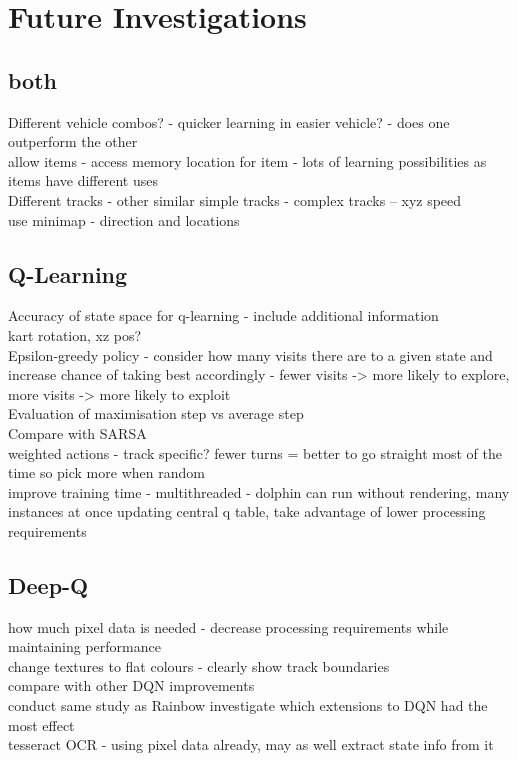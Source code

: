 
\chapter{Future Investigations}
\section{both}
Different vehicle combos? - quicker learning in easier vehicle? - does one outperform the other
\\ allow items - access memory location for item - lots of learning possibilities as items have different uses
\\Different tracks - other similar simple tracks - complex tracks -- xyz speed
\\ use minimap - direction and locations

\section{Q-Learning}
Accuracy of state space for q-learning - include additional information\\
kart rotation, xz pos?
\\ Epsilon-greedy policy - consider how many visits there are to a given state and increase chance of taking best accordingly - fewer visits -> more likely to explore, more visits -> more likely to exploit
\\ Evaluation of maximisation step vs average step
\\ Compare with SARSA
\\ weighted actions - track specific? fewer turns = better to go straight most of the time so pick more when random
\\ improve training time - multithreaded - dolphin can run without rendering, many instances at once updating central q table, take advantage of lower processing requirements

\section{Deep-Q}
how much pixel data is needed - decrease processing requirements while maintaining performance
\\ change textures to flat colours - clearly show track boundaries
\\ compare with other DQN improvements
\\ conduct same study as Rainbow \cite{hessel2018rainbow} investigate which extensions to DQN had the most effect
\\ tesseract OCR - using pixel data already, may as well extract state info from it
